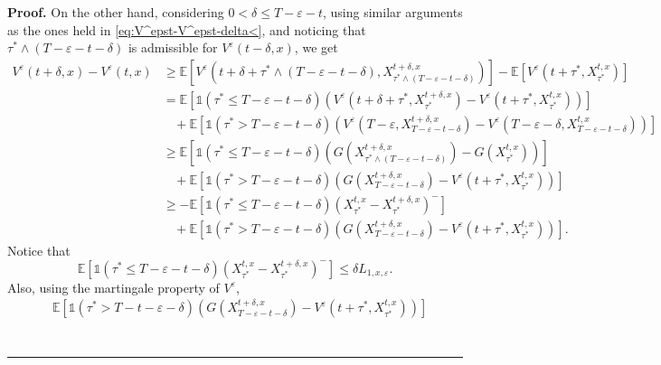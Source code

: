 \documentclass{tufte-handout}
\newcommand{\E}{\mathbb{E}} %
\newenvironment{pf}[1][Proof]{\textbf{#1.} }{\ \rule{0.5em}{0.5em}}
\begin{document}
\begin{pf}
		On the other hand, considering $0 < \delta \leq T - \varepsilon - t$, using similar arguments as the ones held in \eqref{eq:V^epst-V^epst-delta<}, and noticing that $\tau^*\wedge(T - \varepsilon - t - \delta)$ is admissible for $V^\varepsilon(t - \delta, x)$, we get
		\begin{align}
		V^\varepsilon(t + \delta, x) - V^\varepsilon(t, x) &\geq \E\left[V^\varepsilon\left(t + \delta + \tau^*\wedge(T - \varepsilon - t - \delta), X_{\tau^*\wedge(T - \varepsilon - t - \delta)}^{t + \delta, x}\right)\right] - \E\left[V^\varepsilon\left(t + \tau^*, X_{\tau^*}^{t, x}\right)\right] \nonumber \\
		&= \E\left[\mathbb{1}(\tau^* \leq T - \varepsilon - t - \delta)\left(V^\varepsilon\left(t + \delta + \tau^*, X_{\tau^*}^{t + \delta, x}\right) - V^\varepsilon\left(t + \tau^*, X_{\tau^*}^{t, x}\right)\right)\right] \nonumber \\
		&\ \ \ \ +\E\left[\mathbb{1}(\tau^* > T - \varepsilon - t - \delta)\left(V^\varepsilon\left(T - \varepsilon, X_{T - \varepsilon - t - \delta}^{t + \delta, x}\right) - V^\varepsilon\left(T - \varepsilon - \delta, X_{T - \varepsilon - t - \delta}^{t, x}\right)\right)\right] \nonumber \\
		&\geq \E\left[\mathbb{1}(\tau^*\leq T - \varepsilon - t - \delta)\left(G\left(X_{\tau^*\wedge(T - \varepsilon - t - \delta)}^{t + \delta, x}\right) - G\left(X_{\tau^*}^{t, x}\right)\right)\right] \nonumber \\
		&\ \ \ \ +\E\left[\mathbb{1}(\tau^* > T - \varepsilon - t - \delta)\left(G(X_{T - \varepsilon - t - \delta}^{t + \delta, x}) - V^{\varepsilon}(t + \tau^*, X_{\tau^*}^{t, x})\right)\right] \nonumber \\
		&\geq -\E\left[\mathbb{1}(\tau^*\leq T - \varepsilon - t - \delta)\left(X_{\tau^*}^{t, x} - X_{\tau^*}^{t + \delta, x}\right)^-\right] \nonumber \\
		&\ \ \ \ +\E\left[\mathbb{1}(\tau^* > T - \varepsilon - t - \delta)\left(G(X_{T - \varepsilon - t - \delta}^{t + \delta, x}) - V^{\varepsilon}(t + \tau^*, X_{\tau^*}^{t, x})\right)\right]. \label{eq:V^epst+delta-V^epst>}
		\end{align}
		Notice that
		$$
		\E\left[\mathbb{1}(\tau^*\leq T - \varepsilon - t - \delta)\left(X_{\tau^*}^{t, x} - X_{\tau^*}^{t + \delta, x}\right)^-\right] \leq \delta L_{1, x, \varepsilon}.
		$$
		Also, using the martingale property of $V^{\varepsilon}$,
		\begin{align}
		&\E\left[\mathbb{1}(\tau^* > T - t - \varepsilon - \delta)\left(G(X_{T - \varepsilon - t - \delta}^{t + \delta, x}) - V^{\varepsilon}(t + \tau^*, X_{\tau^*}^{t, x})\right)\right] \nonumber \\

\end{align}
\end{pf}
\end{document}
